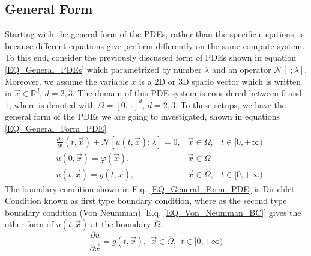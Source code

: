 \subsection{General Form}
Starting with the general form of the PDEs, rather than the specific euqations, is because 
different equations give perform differently on the same compute system.
To this end, consider the previously discussed form of PDEs shown in 
equation \ref{EQ_General_PDEs} which parametrized by number $\lambda$ and an operator $\mathcal{N}[\cdot; \lambda]$.
Moreover, we assume the variable $x$ is a 2D or 3D spatio vector which is written in 
$\vec{x} \in \mathbb{R}^d$, $d = 2, 3$.
The domain of this PDE system is considered between $0$ and $1$, where is denoted with $\Omega = [0, 1]^d$, $d = 2,3$.
To these setups, we have the general form of the PDEs we are going to investigated, shown in equations \ref{EQ_General_Form_PDE}
\begin{align}\label{EQ_General_Form_PDE}
  &\frac{\partial u}{\partial t}\left(t,\vec{x}\right) + \mathcal{N}\left[u(t,\vec{x});\lambda\right] = 0, &\vec{x}\in\Omega, &t\in[0, +\infty) \nonumber\\
  &u\left(0,\vec{x}\right) = \varphi (\vec{x}), &\vec{x}\in\Omega & \\
  &u\left(t,\vec{x}\right) = g (t,\vec{x}),     &\vec{x}\in \overline{\Omega}, &t\in[0, +\infty) \nonumber
\end{align}
The boundary condition shown in E.q. \ref{EQ_General_Form_PDE} is Dirichlet Condition known as first type boundary condition, where as the 
second type boundary condition (Von Neumman) [E.q. \ref{EQ_Von_Neumman_BC}] gives the other form of $u(t,\vec{x})$ at the boundary $\overline{\Omega}$.
\begin{equation}\label{EQ_Von_Neumman_BC}
  \frac{\partial u}{\partial \vec{x}} = g(t, \vec{x}),\:\: \vec{x}\in \overline{\Omega}, \:\:t\in[0, +\infty)
\end{equation}


